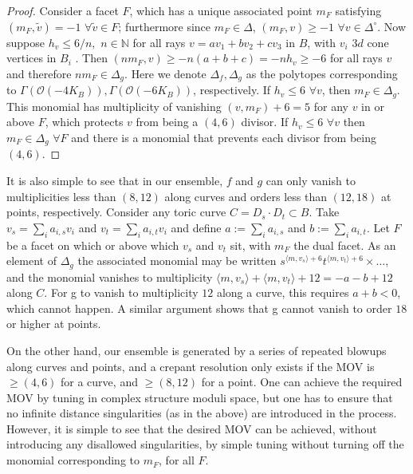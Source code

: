 \documentclass[aps,prl,twocolumn, superscriptaddress,groupedaddress,nofootinbib]{revtex4-1}
\newcommand{\vev}[1]{\langle #1 \rangle}
\begin{document}
\begin{proof}
Consider a facet
$F$, which has a unique associated point $m_F$ satisfying
$(m_F,\tilde v)=-1 \,\, \forall \tilde v \in F$; furthermore
since $m_F\in\Delta$, 
$(m_F,v)\geq -1\,\, \forall v\in\Delta^\circ$. Now
suppose $h_v \leq 6/n, \,\, n \in \mathbb{N}$  
for all rays $v=av_1 + b v_2 + c v_3$
in $B$, with $v_i$ $3d$ cone vertices in $B_i$ . Then 
$(nm_F, v)\geq -n(a+b+c)=-nh_v\geq -6$ for all rays $v$ and
therefore $nm_F \in \Delta_g$. {\color{red}Here we denote $\Delta_{f},\Delta_{g}$ as the polytopes corresponding to $\Gamma (\mathcal{O}(-4 K_B)),\Gamma (\mathcal{O}(-6 K_B))$, respectively.} If $h_v\leq 6\,\, \forall v$, then $m_F\in\Delta_g$. This monomial has multiplicity of vanishing
$(v,m_F)+6=5$ for any $v$ in or above $F$, which protects
$v$ from being a $(4,6)$ divisor. If
$h_v\leq 6 \,\, \forall v$ then $m_F \in \Delta_g\,\, \forall F$
and there is a monomial that prevents
each divisor from being $(4,6)$.
\end{proof}

It is also simple to see that in our ensemble, $f$ and $g$ can only vanish to multiplicities less than $(8,12)$ along curves and orders less than $(12,18)$ at points, respectively. Consider any toric curve $C=D_s\cdot D_t \subset B$. Take $v_s=\sum_i a_{i,s} v_i$ and $v_t=\sum_i a_{i,t} v_i$ and define $a:=\sum_i a_{i,s}$ and $b:=\sum_i a_{i,t}$. Let $F$ be a facet
on which or above which $v_s$ and $v_t$ sit, with $m_F$ the dual facet. As an
element of $\Delta_g$ the associated monomial may be written
$s^{\vev{m,v_s}+6}t^{\vev{m,v_t}+6}\times \dots$,
and the monomial vanishes to multiplicity $\vev{m,v_s}+\vev{m,v_t}+12=-a-b+12$ along $C$. For g to vanish to multiplicity $12$ along a curve, this requires $a+ b <0$, which cannot happen. A similar argument shows that g cannot vanish to order $18$ or higher at points.

On the other hand, our ensemble is generated by a series of repeated blowups along curves and points, and a crepant resolution only exists if the MOV is $\geq (4,6)$ for a curve, and $\geq (8,12)$  for a point. One can achieve the required MOV by tuning in complex structure moduli space, but one has to ensure that no infinite distance singularities (as in the above) are introduced in the process. However, it is simple to see that the desired MOV can be achieved, without introducing any disallowed singularities, by simple tuning without turning off the monomial corresponding to $m_F$, for all $F$. 
\end{document}
